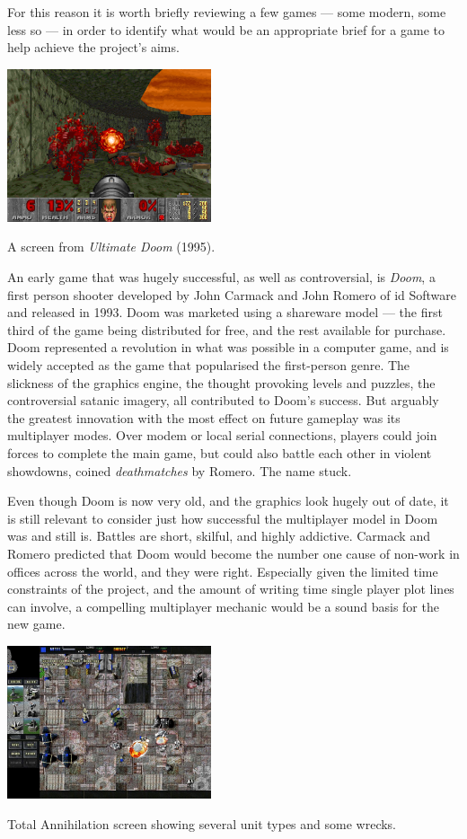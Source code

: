 For this reason it is worth briefly reviewing a few games --- some modern, some less so --- in order to identify what would be an appropriate brief for a game to help achieve the project's aims.

\begin{marginfigure}
	\includegraphics[width=6cm]{res/doom/doom.png}
	\caption{A screen from \emph{Ultimate Doom} (1995).}
	\label{fig:doom}
\end{marginfigure}

An early game that was hugely successful, as well as controversial, is \emph{Doom}, a first person shooter developed by John Carmack and John Romero of id Software and released in 1993. Doom was marketed using a shareware model --- the first third of the game being distributed for free, and the rest available for purchase. Doom represented a revolution in what was possible in a computer game, and is widely accepted as the game that popularised the first-person genre. The slickness of the graphics engine, the thought provoking levels and puzzles, the controversial satanic imagery, all contributed to Doom's success. But arguably the greatest innovation with the most effect on future gameplay was its multiplayer modes. Over modem or local serial connections, players could join forces to complete the main game, but could also battle each other in violent showdowns, coined \emph{deathmatches} by Romero. The name stuck.

Even though Doom is now very old, and the graphics look hugely out of date, it is still relevant to consider just how successful the multiplayer model in Doom was and still is. Battles are short, skilful, and highly addictive. Carmack and Romero predicted that Doom would become the number one cause of non-work in offices across the world, and they were right. Especially given the limited time constraints of the project, and the amount of writing time single player plot lines can involve, a compelling multiplayer mechanic would be a sound basis for the new game.

\begin{marginfigure}
	\includegraphics[width=6cm]{res/ta/ta}
	\caption{Total Annihilation screen showing several unit types and some wrecks.}
	\label{fig:doom}
\end{marginfigure}

